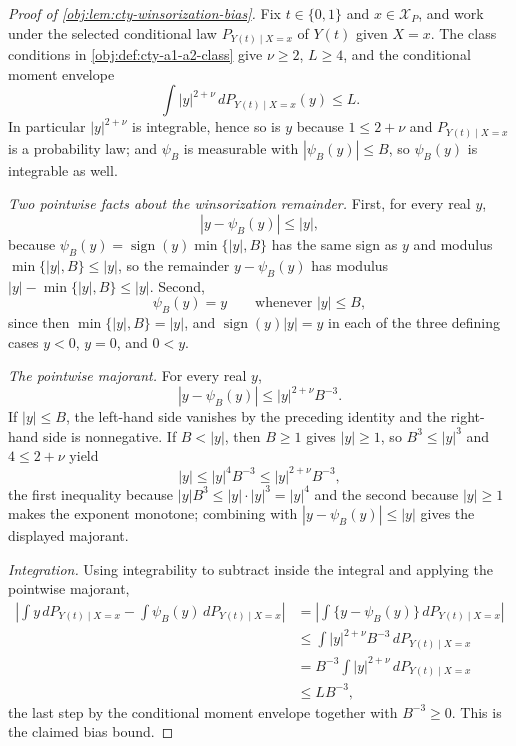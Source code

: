 \begin{proof}[Proof of \cref{obj:lem:cty-winsorization-bias}]
Fix \(t\in\{0,1\}\) and \(x\in\mathcal X_P\), and work under the selected
conditional law \(P_{Y(t)\mid X=x}\) of \(Y(t)\) given \(X=x\).  The class
conditions in \cref{obj:def:cty-a1-a2-class} give \(\nu\ge2\), \(L\ge4\), and the
conditional moment envelope
\[
\int |y|^{2+\nu}\,dP_{Y(t)\mid X=x}(y)\le L .
\]
In particular \(|y|^{2+\nu}\) is integrable, hence so is \(y\) because
\(1\le 2+\nu\) and \(P_{Y(t)\mid X=x}\) is a probability law; and \(\psi_B\) is
measurable with \(|\psi_B(y)|\le B\), so \(\psi_B(y)\) is integrable as well.

\emph{Two pointwise facts about the winsorization remainder.}  First, for every
real \(y\),
\[
|y-\psi_B(y)|\le |y| ,
\]
because \(\psi_B(y)=\operatorname{sign}(y)\min\{|y|,B\}\) has the same sign as
\(y\) and modulus \(\min\{|y|,B\}\le|y|\), so the remainder \(y-\psi_B(y)\) has
modulus \(|y|-\min\{|y|,B\}\le|y|\).
Second,
\[
\psi_B(y)=y
\qquad\text{whenever } |y|\le B ,
\]
since then \(\min\{|y|,B\}=|y|\), and \(\operatorname{sign}(y)|y|=y\) in each of
the three defining cases \(y<0\), \(y=0\), and \(0<y\).

\emph{The pointwise majorant.}  For every real \(y\),
\[
|y-\psi_B(y)|\le |y|^{2+\nu}B^{-3}.
\]
If \(|y|\le B\), the left-hand side vanishes by the preceding identity and the
right-hand side is nonnegative.  If \(B<|y|\), then \(B\ge1\) gives \(|y|\ge1\),
so \(B^3\le|y|^3\) and \(4\le 2+\nu\) yield
\[
|y|\le |y|^{4}B^{-3}\le |y|^{2+\nu}B^{-3},
\]
the first inequality because \(|y|B^3\le|y|\cdot|y|^3=|y|^4\) and the second
because \(|y|\ge1\) makes the exponent monotone; combining with
\(|y-\psi_B(y)|\le|y|\) gives the displayed majorant.

\emph{Integration.}  Using integrability to subtract inside the integral and
applying the pointwise majorant,
\[
\begin{aligned}
\left|\int y\,dP_{Y(t)\mid X=x}-\int \psi_B(y)\,dP_{Y(t)\mid X=x}\right|
&=\left|\int \{y-\psi_B(y)\}\,dP_{Y(t)\mid X=x}\right| \\
&\le \int |y|^{2+\nu}B^{-3}\,dP_{Y(t)\mid X=x} \\
&= B^{-3}\int |y|^{2+\nu}\,dP_{Y(t)\mid X=x} \\
&\le L B^{-3},
\end{aligned}
\]
the last step by the conditional moment envelope together with \(B^{-3}\ge0\).
This is the claimed bias bound.
\end{proof}
